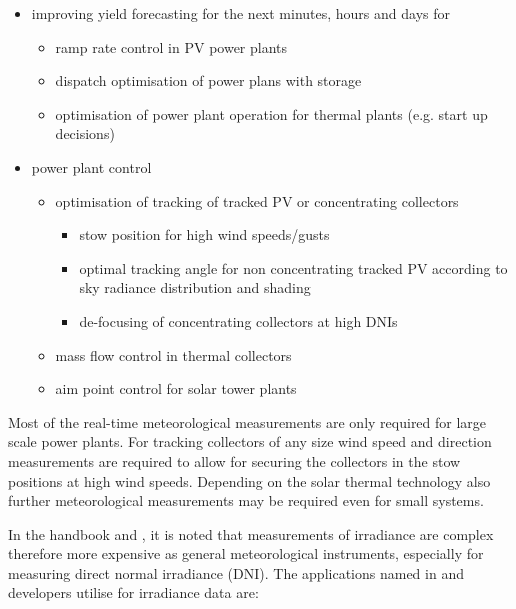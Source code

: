 \begin{itemize}
    \item improving yield forecasting for the next minutes, hours and days for
        \begin{itemize}
            \item ramp rate control in PV power plants
            \item dispatch optimisation of power plans with storage
            \item optimisation of power plant operation for thermal plants (e.g. start up decisions)
        \end{itemize}
    \item power plant control
        \begin{itemize}
            \item optimisation of tracking of tracked PV or concentrating collectors
                \begin{itemize}
                    \item stow position for high wind speeds/gusts
                    \item optimal tracking angle for non concentrating tracked PV according to sky radiance distribution and shading
                    \item de-focusing of concentrating collectors at high DNIs
                \end{itemize}
            \item mass flow control in thermal collectors
            \item aim point control for solar tower plants
        \end{itemize}
\end{itemize}

Most of the real-time meteorological measurements are only required for large scale power plants. For tracking collectors of any size wind speed and direction measurements are required to allow for securing the collectors in the stow positions at high wind speeds. Depending on the solar thermal technology also further meteorological measurements may be required even for small systems. 

In the handbook \cite{nrelhandbook2017} and \cite{nrelhandbook2021}, it is noted that measurements of irradiance are complex therefore more expensive as general meteorological instruments, especially for measuring direct normal irradiance (DNI). The applications named in \cite{nrelhandbook2017} and \cite{nrelhandbook2021} developers utilise for irradiance data are:


